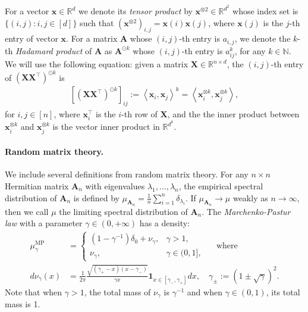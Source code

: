 \documentclass[twoside,11pt]{article}
\newcommand{\inner}[1]{\left\langle #1 \right\rangle}
\newcommand{\R}{\mathbb{R}}
\newcommand{\N}{\mathbb{N}}
\def\bA{{\boldsymbol A}}
\def\bX{{\boldsymbol X}}
\def\bx{{\boldsymbol x}}
\newcommand{\x}{\boldsymbol{x}}
\newcommand{\1}{\mathbf{1}}
\def\tran{^\top}
\def\Real{\mathbb{R}}
\begin{document}
  For a  vector $\bx\in\Real^{d}$ we denote its \textit{tensor product} by $\bx^{ \otimes 2}\in\Real^{ d^2}$ whose index set is $\{(i,j): i,j\in [d] \}$ such that  $\left(\bx^{ \otimes 2}\right)_{i,j}=\bx(i)\bx(j)$, where $\bx(j)$ is the $j$-th entry of vector $\bx$.
 For a matrix $\bA $ whose $(i,j)$-th entry is $a_{i,j}$, we denote the $k$-th \textit{Hadamard product} of $\bA$ as $\bA^{\odot k}$ whose $(i,j)$-th entry is $a_{ij}^k$, for any $k\in\N$. We will use the following equation: given a matrix $\bX\in \R^{n\times d}$, the $(i,j)$-th entry of $(\bX\bX\tran)^{\odot k}$ is
\begin{align}\label{eq:tensor_representation}
    [(\bX\bX\tran)^{\odot k}]_{ij} := \inner{\x_i,\x_j}^k = \inner{\x_i^{\otimes k},\x_j^{\otimes k}},
\end{align}
for $i,j\in[n]$, where $\x_i\tran$ is the $i$-th row of $\bX$, and the the inner product between $\x_i^{\otimes k}$ and $\x_j^{\otimes k}$ is the vector inner product in $\mathbb R^{d^k}$.



\paragraph{Random matrix theory.}
We include several definitions from random matrix theory.  For any $n\times n$ Hermitian matrix $\bA_n$ with eigenvalues $\lambda_1,\dots, \lambda_n$, the empirical spectral distribution of $\bA_n$ is defined by 
$ \mu_{\bA_n}=\frac{1}{n}\sum_{i=1}^n \delta_{\lambda_i}$. If $\mu_{\bA_n}\to\mu$ weakly as $n\to\infty$, then we call $\mu$ the limiting spectral distribution of $\bA_n$.  The \textit{Marchenko-Pastur law} \citep{marchenko1967distribution} with a parameter $\gamma\in (0,+\infty)$ has a  density:
\begin{align}\label{eq:def_mualpha}
   \mu_{\gamma}^{\mathrm{MP}}&= \begin{cases}
        (1-\gamma^{-1})\delta_0+\nu_{\gamma},  & \gamma>1,\\
        \nu_{\gamma}, & \gamma\in (0,1], 
    \end{cases} \quad \text{ where}\\
 d\nu_{\gamma}(x)&=\frac{1}{2\pi}\frac{\sqrt{(\gamma_{+}-x)(x-\gamma_-)}}{\gamma x} \mathbf{1}_{x\in [\gamma_{-},\gamma_+]} dx,  \quad \gamma_{\pm} :=(1\pm \sqrt{\gamma})^2. \label{eq:def_nualpha}
\end{align}
Note that when $\gamma>1$, the total mass of $\nu_{\gamma}$ is $\gamma^{-1}$ and when $\gamma \in (0,1)$, its total mass  is 1.
\end{document}
